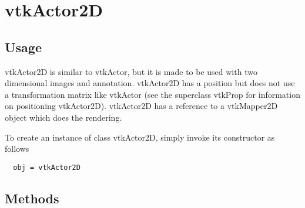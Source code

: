 \section{vtkActor2D}

\subsection{Usage}

 vtkActor2D is similar to vtkActor, but it is made to be used with two
 dimensional images and annotation.  vtkActor2D has a position but does not
 use a transformation matrix like vtkActor (see the superclass vtkProp
 for information on positioning vtkActor2D).  vtkActor2D has a reference to
 a vtkMapper2D object which does the rendering.

To create an instance of class vtkActor2D, simply
invoke its constructor as follows
\begin{verbatim}
  obj = vtkActor2D
\end{verbatim}
\subsection{Methods}

